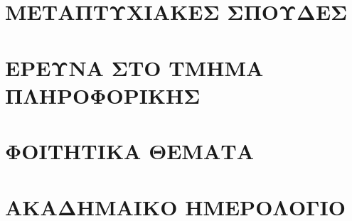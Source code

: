 \documentclass[
]{article}
\begin{document}
\hypertarget{ux3bcux3b5ux3c4ux3b1ux3c0ux3c4ux3c5ux3c7ux3b9ux3b1ux3baux3b5ux3c3-ux3c3ux3c0ux3bfux3c5ux3b4ux3b5ux3c3}{%
\section{ΜΕΤΑΠΤΥΧΙΑΚΕΣ
ΣΠΟΥΔΕΣ}\label{ux3bcux3b5ux3c4ux3b1ux3c0ux3c4ux3c5ux3c7ux3b9ux3b1ux3baux3b5ux3c3-ux3c3ux3c0ux3bfux3c5ux3b4ux3b5ux3c3}}

\hypertarget{ux3b5ux3c1ux3b5ux3c5ux3bdux3b1-ux3c3ux3c4ux3bf-ux3c4ux3bcux3b7ux3bcux3b1-ux3c0ux3bbux3b7ux3c1ux3bfux3c6ux3bfux3c1ux3b9ux3baux3b7ux3c3}{%
\section{ΕΡΕΥΝΑ ΣΤΟ ΤΜΗΜΑ
ΠΛΗΡΟΦΟΡΙΚΗΣ}\label{ux3b5ux3c1ux3b5ux3c5ux3bdux3b1-ux3c3ux3c4ux3bf-ux3c4ux3bcux3b7ux3bcux3b1-ux3c0ux3bbux3b7ux3c1ux3bfux3c6ux3bfux3c1ux3b9ux3baux3b7ux3c3}}

\hypertarget{ux3c6ux3bfux3b9ux3c4ux3b7ux3c4ux3b9ux3baux3b1-ux3b8ux3b5ux3bcux3b1ux3c4ux3b1}{%
\section{ΦΟΙΤΗΤΙΚΑ
ΘΕΜΑΤΑ}\label{ux3c6ux3bfux3b9ux3c4ux3b7ux3c4ux3b9ux3baux3b1-ux3b8ux3b5ux3bcux3b1ux3c4ux3b1}}

\hypertarget{ux3b1ux3baux3b1ux3b4ux3b7ux3bcux3b1ux3b9ux3baux3bf-ux3b7ux3bcux3b5ux3c1ux3bfux3bbux3bfux3b3ux3b9ux3bf}{%
\section{ΑΚΑΔΗΜΑΙΚΟ
ΗΜΕΡΟΛΟΓΙΟ}\label{ux3b1ux3baux3b1ux3b4ux3b7ux3bcux3b1ux3b9ux3baux3bf-ux3b7ux3bcux3b5ux3c1ux3bfux3bbux3bfux3b3ux3b9ux3bf}}
\end{document}

